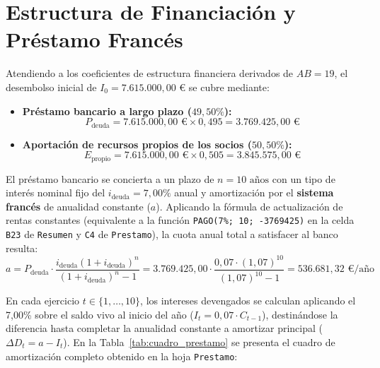 \documentclass[a4paper,11pt]{report}
\providecommand{\euro}{€}
\begin{document}
\section{Estructura de Financiación y Préstamo Francés}
Atendiendo a los coeficientes de estructura financiera derivados de $AB = 19$, el desembolso inicial de $I_0 = 7.615.000,00\text{ \euro}$ se cubre mediante:
\begin{itemize}
    \item \textbf{Préstamo bancario a largo plazo ($49,50\%$):}
    \begin{equation}
        P_{\text{deuda}} = 7.615.000,00\text{ \euro} \times 0,495 = 3.769.425,00\text{ \euro}
    \end{equation}
    \item \textbf{Aportación de recursos propios de los socios ($50,50\%$):}
    \begin{equation}
        E_{\text{propio}} = 7.615.000,00\text{ \euro} \times 0,505 = 3.845.575,00\text{ \euro}
    \end{equation}
\end{itemize}

El préstamo bancario se concierta a un plazo de $n = 10\text{ años}$ con un tipo de interés nominal fijo del $i_{\text{deuda}} = 7,00\%$ anual y amortización por el \textbf{sistema francés} de anualidad constante ($a$). Aplicando la fórmula de actualización de rentas constantes (equivalente a la función \texttt{PAGO(7\%; 10; -3769425)} en la celda \texttt{B23} de \texttt{Resumen} y \texttt{C4} de \texttt{Prestamo}), la cuota anual total a satisfacer al banco resulta:
\begin{equation}
    a = P_{\text{deuda}} \cdot \frac{i_{\text{deuda}}(1+i_{\text{deuda}})^n}{(1+i_{\text{deuda}})^n - 1} = 3.769.425,00 \cdot \frac{0,07\cdot(1,07)^{10}}{(1,07)^{10} - 1} = 536.681,32\text{ \euro/año}
\end{equation}

En cada ejercicio $t \in \{1,\dots,10\}$, los intereses devengados se calculan aplicando el 7,00\% sobre el saldo vivo al inicio del año ($I_t = 0,07 \cdot C_{t-1}$), destinándose la diferencia hasta completar la anualidad constante a amortizar principal ($\Delta D_t = a - I_t$). En la Tabla~\ref{tab:cuadro_prestamo} se presenta el cuadro de amortización completo obtenido en la hoja \texttt{Prestamo}:
\end{document}
